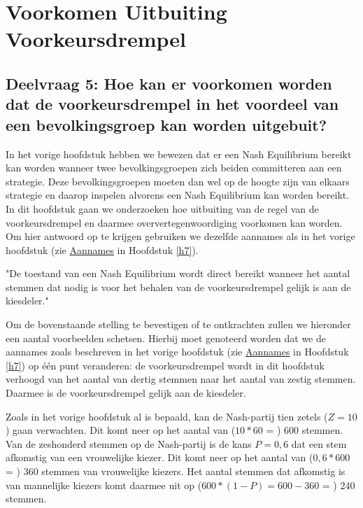 \newpage
\section{Voorkomen Uitbuiting Voorkeursdrempel}
\label{h8}

\subsection*{Deelvraag 5: Hoe kan er voorkomen worden dat de voorkeursdrempel in het voordeel van een bevolkingsgroep kan worden uitgebuit?}

In het vorige hoofdstuk hebben we bewezen dat er een Nash Equilibrium bereikt kan worden wanneer twee bevolkingsgroepen zich beiden committeren aan een strategie. Deze bevolkingsgroepen moeten dan wel op de hoogte zijn van elkaars strategie en daarop inspelen alvorens een Nash Equilibrium kan worden bereikt. In dit hoofdstuk gaan we onderzoeken hoe uitbuiting van de regel van de voorkeursdrempel en daarmee oververtegenwoordiging voorkomen kan worden. Om hier antwoord op te krijgen gebruiken we dezelfde aannames als in het vorige hoofdstuk (zie \hyperref[aannamesNash]{Aannames} in Hoofdstuk \ref{h7}). \\


\begin{theorem}
"De toestand van een Nash Equilibrium wordt direct bereikt wanneer het aantal stemmen dat nodig is voor het behalen van de voorkeursdrempel gelijk is aan de kiesdeler." \\
\end{theorem}

Om de bovenstaande stelling te bevestigen of te ontkrachten zullen we hieronder een aantal voorbeelden schetsen. Hierbij moet genoteerd worden dat we de aannames zoals beschreven in het vorige hoofdstuk (zie \hyperref[aannamesNash]{Aannames} in Hoofdstuk \ref{h7}) op één punt veranderen: de voorkeursdrempel wordt in dit hoofdstuk verhoogd van het aantal van dertig stemmen naar het aantal van zestig stemmen. Daarmee is de voorkeursdrempel gelijk aan de kiesdeler. 

Zoals in het vorige hoofdstuk al is bepaald, kan de Nash-partij tien zetels ($Z=10$) gaan verwachten. Dit komt neer op het aantal van ($10*60$ = ) 600 stemmen. Van de zeshonderd stemmen op de Nash-partij is de kans $P=0,6$ dat een stem afkomstig van een vrouwelijke kiezer. Dit komt neer op het aantal van ($0,6*600$ = ) 360 stemmen van vrouwelijke kiezers. Het aantal stemmen dat afkomstig is van mannelijke kiezers komt daarmee uit op ($600*(1-P)=600-360$ = ) 240 stemmen.

